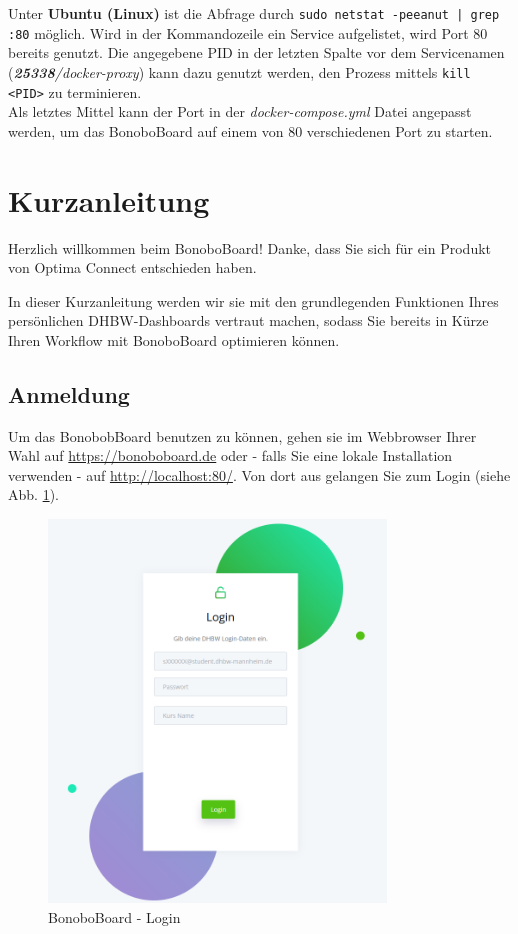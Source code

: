 \documentclass[a4paper,11pt]{scrartcl}
\begin{document}
\noindent Unter \textbf{Ubuntu (Linux)} ist die Abfrage durch \texttt{sudo netstat -peeanut | grep :80} möglich.
Wird in der Kommandozeile ein Service aufgelistet, wird Port 80 bereits genutzt. Die angegebene PID in der letzten Spalte vor dem Servicenamen (\textit{\textbf{25338}/docker-proxy}) kann dazu genutzt werden, den Prozess mittels \texttt{kill <PID>} zu terminieren.\\
Als letztes Mittel kann der Port in der \textit{docker-compose.yml} Datei angepasst werden, um das BonoboBoard auf einem von 80 verschiedenen Port zu starten.

\clearpage
\section{Kurzanleitung}\label{Kurzanleitung}
Herzlich willkommen beim BonoboBoard! Danke, dass Sie sich für ein Produkt von Optima Connect entschieden haben. 

\bigskip
\noindent In dieser Kurzanleitung werden wir sie mit den grundlegenden Funktionen Ihres persönlichen DHBW-Dashboards vertraut machen, sodass Sie bereits in Kürze Ihren Workflow mit BonoboBoard optimieren können.

\subsection{Anmeldung}
Um das BonobobBoard benutzen zu können, gehen sie im Webbrowser Ihrer Wahl auf \url{https://bonoboboard.de} oder - falls Sie eine lokale Installation verwenden - auf \url{http://localhost:80/}. Von dort aus gelangen Sie zum Login (siehe Abb. \ref{img:login}).

\begin{figure}[H]
	\begin{center}
		\includegraphics[width=0.8\textwidth]{login}
		\caption{BonoboBoard - Login}
		\label{img:login}
	\end{center}
\end{figure}
\end{document}
